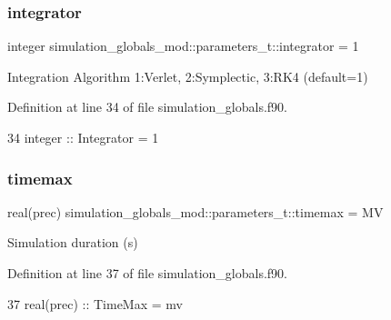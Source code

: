 \subsubsection{\texorpdfstring{integrator}{integrator}}
{\footnotesize\ttfamily integer simulation\+\_\+globals\+\_\+mod\+::parameters\+\_\+t\+::integrator = 1\hspace{0.3cm}{\ttfamily [private]}}



Integration Algorithm 1\+:Verlet, 2\+:Symplectic, 3\+:R\+K4 (default=1) 



Definition at line 34 of file simulation\+\_\+globals.\+f90.


\begin{DoxyCode}
34         \textcolor{keywordtype}{integer}    :: Integrator = 1
\end{DoxyCode}
\mbox{\label{structsimulation__globals__mod_1_1parameters__t_ad09359247decb284f0ec62e1b9a817b0}} 
\subsubsection{\texorpdfstring{timemax}{timemax}}
{\footnotesize\ttfamily real(prec) simulation\+\_\+globals\+\_\+mod\+::parameters\+\_\+t\+::timemax = MV\hspace{0.3cm}{\ttfamily [private]}}



Simulation duration (s) 



Definition at line 37 of file simulation\+\_\+globals.\+f90.


\begin{DoxyCode}
37         \textcolor{keywordtype}{real(prec)} :: TimeMax = mv          
\end{DoxyCode}
\mbox{\label{structsimulation__globals__mod_1_1parameters__t_af4190961e6191cf07a9b04b0b864ec95}} 
